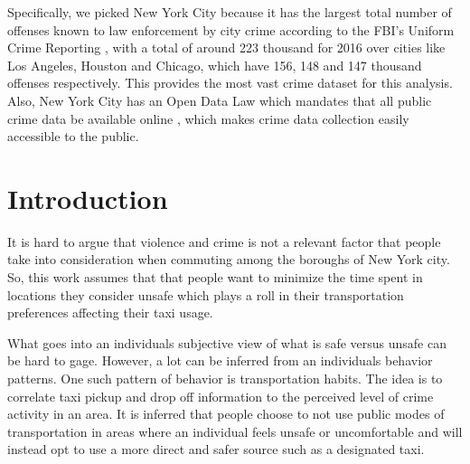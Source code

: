 \documentclass{sigkddExp}
\begin{document}
Specifically, we picked New York City because it has the largest  total number of offenses known to law enforcement by city crime according to the FBI's Uniform Crime Reporting \cite{fbiUniformCrime}, with a total of around 223 thousand for 2016 over cities like Los Angeles, Houston and Chicago, which have 156, 148 and
147 thousand offenses respectively. 
This provides the most vast crime dataset for this analysis.
Also, New York City has an Open Data Law which mandates that all public crime data be available online \cite{OpenDat}, which makes crime data collection easily accessible to the public.




\section{Introduction}

It is hard to argue that violence and crime is not a relevant factor that people take into consideration when commuting among the boroughs of New York city. 
So, this work assumes that that people want to minimize the time spent in locations they consider unsafe which  plays a roll in their transportation preferences affecting their taxi usage. 

What goes into an individuals subjective view of what is safe versus unsafe can be hard to gage. However, a lot can be inferred from an individuals behavior patterns.
One such pattern of behavior is transportation habits. The idea is to correlate taxi pickup and drop off information to the perceived level of crime activity in an area. 
It is inferred that people choose to not use public modes of transportation in areas where an individual feels unsafe or uncomfortable and will instead opt to use a more direct and safer source such as a designated taxi. 
\end{document}
